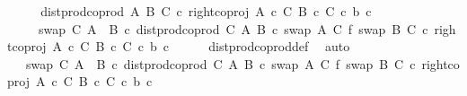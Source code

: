\begin{isabellebody}
\ {\isacharminus}{\kern0pt}\isanewline
\ \ \isamarkupfalse%
\ {\isachardoublequoteopen}dist{\isacharunderscore}{\kern0pt}prod{\isacharunderscore}{\kern0pt}coprod{}\ A\ B\ C\ {\isasymcirc}\isactrlsub c\ right{\isacharunderscore}{\kern0pt}coproj\ {\isacharparenleft}{\kern0pt}A\ {\isasymtimes}\isactrlsub c\ C{\isacharparenright}{\kern0pt}\ {\isacharparenleft}{\kern0pt}B\ {\isasymtimes}\isactrlsub c\ C{\isacharparenright}{\kern0pt}\ {\isasymcirc}\isactrlsub c\ {\isasymlangle}b{\isacharcomma}{\kern0pt}\ c{\isasymrangle}\isanewline
\ \ \ \ {\isacharequal}{\kern0pt}\ {\isacharparenleft}{\kern0pt}swap\ C\ {\isacharparenleft}{\kern0pt}A\ {\isasymCoprod}\ B{\isacharparenright}{\kern0pt}\ {\isasymcirc}\isactrlsub c\ dist{\isacharunderscore}{\kern0pt}prod{\isacharunderscore}{\kern0pt}coprod\ C\ A\ B\ {\isasymcirc}\isactrlsub c\ {\isacharparenleft}{\kern0pt}swap\ A\ C\ {\isasymbowtie}\isactrlsub f\ swap\ B\ C{\isacharparenright}{\kern0pt}{\isacharparenright}{\kern0pt}\ {\isasymcirc}\isactrlsub c\ {\isacharparenleft}{\kern0pt}right{\isacharunderscore}{\kern0pt}coproj\ {\isacharparenleft}{\kern0pt}A\ {\isasymtimes}\isactrlsub c\ C{\isacharparenright}{\kern0pt}\ {\isacharparenleft}{\kern0pt}B\ {\isasymtimes}\isactrlsub c\ C{\isacharparenright}{\kern0pt}\ {\isasymcirc}\isactrlsub c\ {\isasymlangle}b{\isacharcomma}{\kern0pt}\ c{\isasymrangle}{\isacharparenright}{\kern0pt}{\isachardoublequoteclose}\isanewline
\ \ \ \ \isamarkupfalse%
\ dist{\isacharunderscore}{\kern0pt}prod{\isacharunderscore}{\kern0pt}coprod{}{\isacharunderscore}{\kern0pt}def\ \isamarkupfalse%
\ auto\isanewline
\ \ \isamarkupfalse%
\ \isamarkupfalse%
\ {\isachardoublequoteopen}{\isachardot}{\kern0pt}{\isachardot}{\kern0pt}{\isachardot}{\kern0pt}\ {\isacharequal}{\kern0pt}\ swap\ C\ {\isacharparenleft}{\kern0pt}A\ {\isasymCoprod}\ B{\isacharparenright}{\kern0pt}\ {\isasymcirc}\isactrlsub c\ dist{\isacharunderscore}{\kern0pt}prod{\isacharunderscore}{\kern0pt}coprod\ C\ A\ B\ {\isasymcirc}\isactrlsub c\ {\isacharparenleft}{\kern0pt}{\isacharparenleft}{\kern0pt}swap\ A\ C\ {\isasymbowtie}\isactrlsub f\ swap\ B\ C{\isacharparenright}{\kern0pt}\ {\isasymcirc}\isactrlsub c\ right{\isacharunderscore}{\kern0pt}coproj\ {\isacharparenleft}{\kern0pt}A\ {\isasymtimes}\isactrlsub c\ C{\isacharparenright}{\kern0pt}\ {\isacharparenleft}{\kern0pt}B\ {\isasymtimes}\isactrlsub c\ C{\isacharparenright}{\kern0pt}{\isacharparenright}{\kern0pt}\ {\isasymcirc}\isactrlsub c\ {\isasymlangle}b{\isacharcomma}{\kern0pt}\ c{\isasymrangle}{\isachardoublequoteclose}\isanewline

\end{isabellebody}
